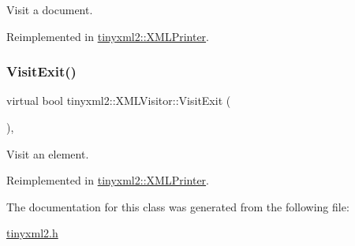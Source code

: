 Visit a document. 



Reimplemented in \mbox{\hyperlink{classtinyxml2_1_1_x_m_l_printer_a15fc1f2b922f540917dcf52808737b29}{tinyxml2\+::\+X\+M\+L\+Printer}}.

\mbox{\label{classtinyxml2_1_1_x_m_l_visitor_a772f10ddc83f881956d32628faa16eb6}} 
\subsubsection{\texorpdfstring{Visit\+Exit()}{VisitExit()}\hspace{0.1cm}{\footnotesize\ttfamily [2/2]}}
{\footnotesize\ttfamily virtual bool tinyxml2\+::\+X\+M\+L\+Visitor\+::\+Visit\+Exit (\begin{DoxyParamCaption}\item[{const \mbox{\hyperlink{classtinyxml2_1_1_x_m_l_element}{X\+M\+L\+Element}} \&}]{ }\end{DoxyParamCaption})\hspace{0.3cm}{\ttfamily [inline]}, {\ttfamily [virtual]}}



Visit an element. 



Reimplemented in \mbox{\hyperlink{classtinyxml2_1_1_x_m_l_printer_a2edd48405971a88951c71c9df86a2f50}{tinyxml2\+::\+X\+M\+L\+Printer}}.



The documentation for this class was generated from the following file\+:\begin{DoxyCompactItemize}
\item 
\mbox{\hyperlink{tinyxml2_8h}{tinyxml2.\+h}}\end{DoxyCompactItemize}
